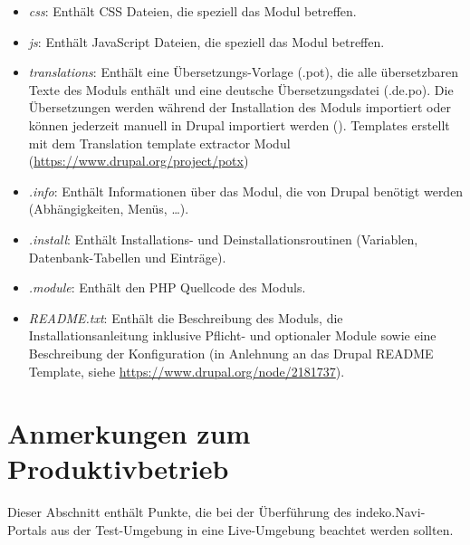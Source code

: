 \begin{itemize}
	\item \textit{css}: Enthält CSS Dateien, die speziell das Modul betreffen.

	\item \textit{js}: Enthält JavaScript Dateien, die speziell das Modul betreffen.

	\item \textit{translations}: Enthält eine Übersetzungs-Vorlage (.pot), die alle übersetzbaren Texte des Moduls enthält und eine deutsche Übersetzungsdatei (.de.po). Die Übersetzungen werden während der Installation des Moduls importiert oder können jederzeit manuell in Drupal importiert werden (). Templates erstellt mit dem Translation template extractor Modul (\url{https://www.drupal.org/project/potx})

	\item \textit{.info}: Enthält Informationen über das Modul, die von Drupal benötigt werden (Abhängigkeiten, Menüs, \dots).

	\item \textit{.install}: Enthält Installations- und Deinstallationsroutinen (Variablen, Datenbank-Tabellen und Einträge).

	\item \textit{.module}: Enthält den PHP Quellcode des Moduls.

	\item \textit{README.txt}: Enthält die Beschreibung des Moduls, die Installationsanleitung inklusive Pflicht- und optionaler Module sowie eine Beschreibung der Konfiguration (in Anlehnung an das Drupal README Template, siehe \url{https://www.drupal.org/node/2181737}).
\end{itemize}




\section{Anmerkungen zum Produktivbetrieb}\label{sec:live}
Dieser Abschnitt enthält Punkte, die bei der Überführung des \acrshort{indeko}.Navi-Portals aus der Test-Umgebung in eine Live-Umgebung beachtet werden sollten.

